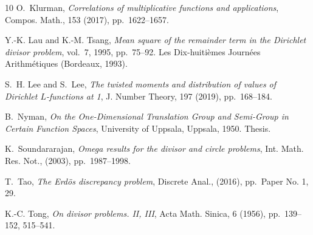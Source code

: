 \documentclass[a4paper,12pt, reqn0]{amsart}
\theoremstyle{remark}
\begin{document}
\begin{thebibliography}{10}
{\sc O.~Klurman}, {\em Correlations of multiplicative functions and
  applications}, Compos. Math., 153 (2017), pp.~1622--1657.

{\sc Y.-K. Lau and K.-M. Tsang}, {\em Mean square of the remainder term in the
  {D}irichlet divisor problem}, vol.~7, 1995, pp.~75--92.
\newblock Les Dix-huiti\`emes Journ\'{e}es Arithm\'{e}tiques (Bordeaux, 1993).

{\sc S.~H. Lee and S.~Lee}, {\em The twisted moments and distribution of values
  of {D}irichlet {$L$}-functions at 1}, J. Number Theory, 197 (2019),
  pp.~168--184.

{\sc B.~Nyman}, {\em On the {O}ne-{D}imensional {T}ranslation {G}roup and
  {S}emi-{G}roup in {C}ertain {F}unction {S}paces}, University of Uppsala,
  Uppsala, 1950.
\newblock Thesis.

{\sc K.~Soundararajan}, {\em Omega results for the divisor and circle
  problems}, Int. Math. Res. Not.,  (2003), pp.~1987--1998.

{\sc T.~Tao}, {\em The {E}rd\"{o}s discrepancy problem}, Discrete Anal.,
  (2016), pp.~Paper No. 1, 29.

{\sc K.-C. Tong}, {\em On divisor problems. {II}, {III}}, Acta Math. Sinica, 6
  (1956), pp.~139--152, 515--541.

\end{thebibliography}
\end{document}
